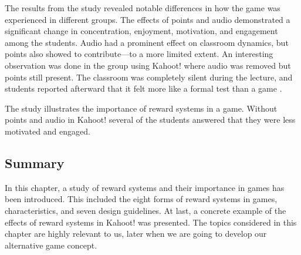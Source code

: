 \documentclass[../Main.tex]{subfiles}
\begin{document}
The results from the study revealed notable differences in how the game was experienced in different groups. The effects of points and audio demonstrated a significant change in concentration, enjoyment, motivation, and engagement among the students. Audio had a prominent effect on classroom dynamics, but points also showed to contribute—to a more limited extent. An interesting observation was done in the group using Kahoot! where audio was removed but points still present. The classroom was completely silent during the lecture, and students reported afterward that it felt more like a formal test than a game \citep{wang_effect_2016}.

The study illustrates the importance of reward systems in a game. Without points and audio in Kahoot! several of the students answered that they were less motivated and engaged.

\subsection{Summary}
In this chapter, a study of reward systems and their importance in games has been introduced. This included the eight forms of reward systems in games, characteristics, and seven design guidelines. At last, a concrete example of the effects of reward systems in Kahoot! was presented. The topics considered in this chapter are highly relevant to us, later when we are going to develop our alternative game concept.

\biblio %
\end{document}
